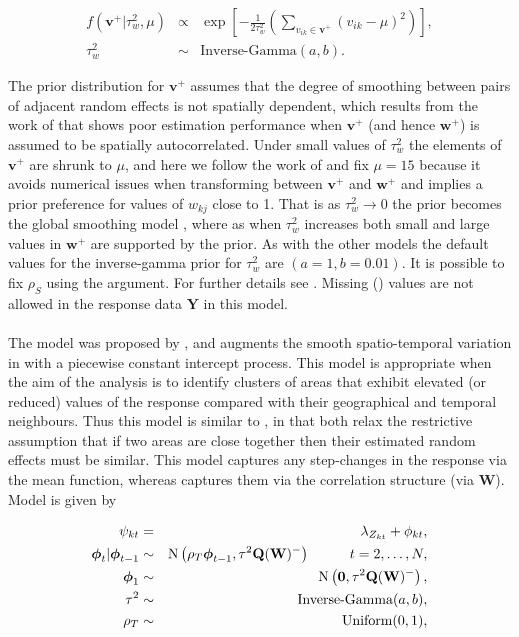 \documentclass[article, nojss]{jss}
\newcommand{\bd}[1]{\ensuremath{\mbox{\boldmath $#1$}}}
\begin{document}
\begin{eqnarray}
f(\mathbf{v}^{+}|\tau^2_w, \mu) & \propto & \exp\left[-\frac{1}{2\tau^2_w}\left(\sum_{v_{ik}\in\mathbf{v}^{+}}(v_{ik} - \mu)^2\right)\right], \label{caradaptive2}\\
\tau^{2}_w&\sim&\mbox{Inverse-Gamma}(a, b).\nonumber
\end{eqnarray}

The prior distribution for $\mathbf{v}^+$ assumes that the degree of smoothing between pairs of adjacent random effects is not spatially dependent, which results from the  work of \cite{rushworth2016} that shows poor estimation performance when $\mathbf{v}^+$ (and hence $\mathbf{w}^+$) is assumed to be spatially autocorrelated. Under small values of $\tau_w^2$ the elements of  $\mathbf{v}^+$ are shrunk to $\mu$, and here we follow the work of \cite{rushworth2016} and fix $\mu=15$ because it avoids numerical issues when transforming between $\mathbf{v}^+$ and $\mathbf{w}^+$ and implies a prior preference for values of $w_{kj}$ close to 1.  That is as $\tau^2_w \rightarrow 0$ the prior becomes the global smoothing model , where as when $\tau^{2}_{w}$ increases both small and large values in $\mathbf{w}^{+}$ are supported by the prior. As with the other models the default values for the inverse-gamma prior for $\tau_w^2$ are $(a=1, b=0.01)$. It is possible to fix $\rho_S$ using the  argument. For further details see \cite{rushworth2016}. Missing () values are not allowed in the response data $\mathbf{Y}$ in this model.\\


\\
The model was proposed by \cite{lee2016}, and augments the smooth spatio-temporal variation in  with a piecewise constant intercept process.  This model is appropriate when the aim of the analysis is to identify clusters of areas that exhibit elevated (or reduced) values of the response compared with their geographical and temporal neighbours. Thus this model is similar to  , in that both relax the restrictive assumption that if two areas are close together then their estimated random effects must be similar. This model captures any step-changes in the response via the mean function, whereas  captures them via the correlation structure (via $\mathbf{W}$). Model  is given by


\begin{eqnarray}
\psi_{kt}&=&\lambda_{Z_{kt}} + \phi_{kt},\label{carcluster1}\\
\bd{\phi}_t|\bd{\phi}_{t-1} & \sim & \mbox{N}\left(\rho_T\bd{\phi}_{t-1}, \tau^{2} \mathbf{Q}(\mathbf{W})^{-}\right)\hspace{1cm} t=2,\ldots,N,\nonumber\\
\bd{\phi}_1 & \sim & \mbox{N}\left(\mathbf{0}, \tau^{2} \mathbf{Q}(\mathbf{W})^{-}\right),\nonumber\\
\tau^2&\sim&\mbox{Inverse-Gamma}(a,b),\nonumber\\
\rho_T&\sim&\mbox{Uniform}(0,1),\nonumber
\end{eqnarray}
\end{document}

